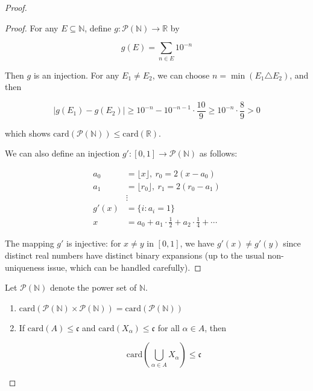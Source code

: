 \begin{proof}
\begin{proof}
    For any $E \subseteq \mathbb{N}$, define $g: \mathcal{P}(\mathbb{N}) \to \mathbb{R}$ by

    \[
        g(E) = \sum_{n \in E} 10^{-n}
    \]

    Then $g$ is an injection. For any $E_1 \ne E_2$, we can choose $n = \min ( E_1 \triangle E_2 )$, and then
    
    \[
        \left| g(E_1) - g(E_2)\right| \ge 10^{-n} - 10^{-n-1} \cdot \frac{10}{9} \ge 10^{-n} \cdot \frac{8}{9} > 0
    \]

    which shows $\mathrm{card}(\mathcal{P}(\mathbb{N})) \le \mathrm{card}(\mathbb{R})$.

    We can also define an injection $g': [0,1] \to \mathcal{P}(\mathbb{N})$ as follows:

    \begin{align*}
        a_0 &= \lfloor x \rfloor,\: r_0 = 2(x - a_0) \\
        a_1 &= \lfloor r_0 \rfloor,\: r_1 = 2(r_0 - a_1) \\
        &\vdots \\
        g'(x) &= \{ i: a_i = 1 \} \\
        x &= a_0  + a_1 \cdot \frac{1}{2} + a_2 \cdot \frac{1}{4} + \cdots
    \end{align*}

    The mapping $g'$ is injective: for $x \neq y$ in $[0,1]$, we have $g'(x) \neq g'(y)$ since distinct real numbers have distinct binary expansions (up to the usual non-uniqueness issue, which can be handled carefully).

\end{proof}

\begin{thm}
    Let $\mathcal{P}(\mathbb{N})$ denote the power set of $\mathbb{N}$.

    \begin{enumerate}
        \item $\mathrm{card}(\mathcal{P}(\mathbb{N}) \times \mathcal{P}(\mathbb{N})) = \mathrm{card}(\mathcal{P}(\mathbb{N}))$

        \item If $\mathrm{card}(A) \le \mathfrak{c}$ and $\mathrm{card}(X_{\alpha}) \le \mathfrak{c}$ for all $\alpha \in A$, then 
        
        \[
        \mathrm{card} \left( \bigcup_{\alpha \in A} X_{\alpha} \right) \le \mathfrak{c} 
        \]
        
    \end{enumerate}
\end{thm}


\end{proof}
